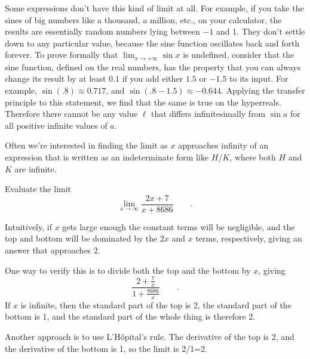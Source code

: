 Some expressions don't have this kind of limit at all. For example, if you take the
sines of big numbers like a thousand, a million, etc., on your calculator, the results
are essentially random numbers lying between $-1$ and 1. They don't settle down to any
particular value, because the sine function oscillates back and forth forever.
To prove formally that $\lim_{x\rightarrow +\infty} \sin x$ is undefined, consider that the sine function, defined on the real
numbers, has the property that you can always change its result by at least $0.1$ if you
add either $1.5$ or $-1.5$ to its input. For example, $\sin(.8)\approx 0.717$, and $\sin(.8-1.5)\approx-0.644$.
Applying the transfer principle to this statement, we find that the same is true
on the hyperreals. Therefore there cannot be any value $\ell$ that differs infinitesimally
from $\sin a$ for all positive infinite values of $a$.

Often we're interested in finding the limit as $x$ approaches infinity of an expression
that is written as an indeterminate form like $H/K$, where both  $H$ and $K$ are infinite.

\begin{eg}
\egquestion Evaluate the limit
\begin{equation*}
  \lim_{x\rightarrow \infty} \frac{2x+7}{x+8686} \qquad .
\end{equation*}

\egquestion Intuitively, if $x$ gets large enough the constant terms will be negligible, and
the top and bottom will be dominated by the $2x$ and $x$ terms, respectively, giving an
answer that approaches 2.

One way to verify this is to divide both the top and the bottom by $x$, giving
\begin{equation*}
  \frac{2+\frac{7}{x}}{1+\frac{8686}{x}} \qquad .
\end{equation*}
If $x$ is infinite, then the standard part of the top is 2, the standard part of the
bottom is 1, and the standard part of the whole thing is therefore 2.

Another approach is to use L'H\^{o}pital's rule. The derivative
of the top is 2, and the derivative of the bottom is 1, so the limit is 2/1=2.
\end{eg}


